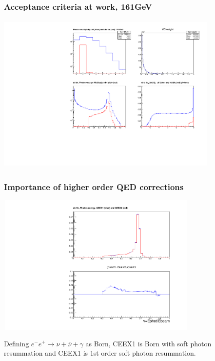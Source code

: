 \documentclass{beamer}
\begin{document}
\begin{frame}[fragile]
\frametitle{\bf Acceptance criteria at work, 161GeV}

\vspace{-2mm}
{\includegraphics[width=110mm,height=80mm]{mcFigInfo.pdf}}

\end{frame}

\begin{frame}[fragile]
\frametitle{\bf Importance of higher order QED corrections}

\vspace{-2mm}
{\includegraphics[width=100mm,height=70mm]{mcCeex21.pdf}}

\small
Defining $e^-e^+\to\nu+\bar\nu+\gamma$ as Born, 
CEEX1 is Born with soft photon resummation 
and CEEX1 is 1st order soft photon resummation.


\end{frame}
\end{document}
